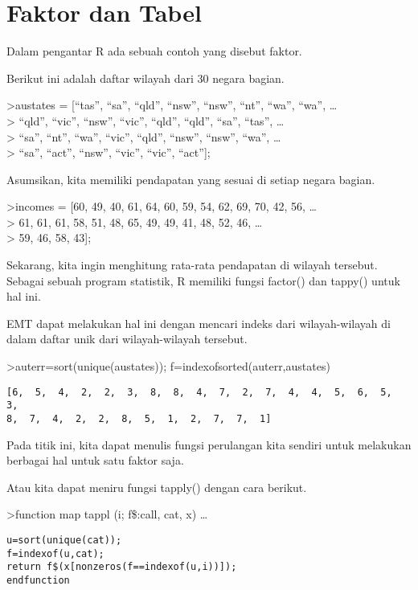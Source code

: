 \documentclass[
]{book}
\begin{document}
\chapter{Faktor dan Tabel}\label{faktor-dan-tabel}

Dalam pengantar R ada sebuah contoh yang disebut faktor.

Berikut ini adalah daftar wilayah dari 30 negara bagian.

\textgreater austates = {[}``tas'', ``sa'', ``qld'', ``nsw'', ``nsw'', ``nt'', ``wa'', ``wa'', \ldots{}\\
\textgreater{} ``qld'', ``vic'', ``nsw'', ``vic'', ``qld'', ``qld'', ``sa'', ``tas'', \ldots{}\\
\textgreater{} ``sa'', ``nt'', ``wa'', ``vic'', ``qld'', ``nsw'', ``nsw'', ``wa'', \ldots{}\\
\textgreater{} ``sa'', ``act'', ``nsw'', ``vic'', ``vic'', ``act''{]};

Asumsikan, kita memiliki pendapatan yang sesuai di setiap negara bagian.

\textgreater incomes = {[}60, 49, 40, 61, 64, 60, 59, 54, 62, 69, 70, 42, 56, \ldots{}\\
\textgreater{} 61, 61, 61, 58, 51, 48, 65, 49, 49, 41, 48, 52, 46, \ldots{}\\
\textgreater{} 59, 46, 58, 43{]};

Sekarang, kita ingin menghitung rata-rata pendapatan di wilayah tersebut. Sebagai sebuah program statistik, R memiliki fungsi factor() dan tappy() untuk hal ini.

EMT dapat melakukan hal ini dengan mencari indeks dari wilayah-wilayah di dalam daftar unik dari wilayah-wilayah tersebut.

\textgreater auterr=sort(unique(austates)); f=indexofsorted(auterr,austates)

\begin{verbatim}
[6,  5,  4,  2,  2,  3,  8,  8,  4,  7,  2,  7,  4,  4,  5,  6,  5,  3,
8,  7,  4,  2,  2,  8,  5,  1,  2,  7,  7,  1]
\end{verbatim}

Pada titik ini, kita dapat menulis fungsi perulangan kita sendiri untuk melakukan berbagai hal untuk satu faktor saja.

Atau kita dapat meniru fungsi tapply() dengan cara berikut.

\textgreater function map tappl (i; f\$:call, cat, x) \ldots{}

\begin{verbatim}
u=sort(unique(cat));
f=indexof(u,cat);
return f$(x[nonzeros(f==indexof(u,i))]);
endfunction
\end{verbatim}
\end{document}
